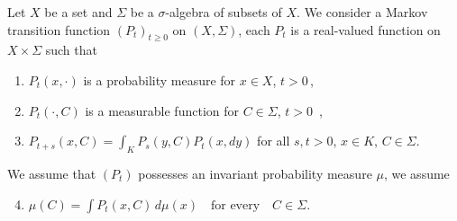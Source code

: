 \begin{example}\label{ex:c4-2.8}
%
%
%
Let $X$ be a set and $\Sigma$ be a $\sigma$-algebra of subsets of $X$.
We consider a Markov transition function $(P_{t})_{t \geq 0}$ on $(X,\Sigma)$, \ie  each $P_{t}$ is a real-valued function on $X \times \Sigma$ such that
\begin{enumerate}[\upshape (i)]
\item \label{ex:c4-2.7-1}
$P_{t}(x,\cdot)$ is a probability measure for $x \in X$, $t > 0$\,,

\item \label{ex:c4-2.7-2}
$P_{t}(\cdot,C)$ is a measurable function for $C \in \Sigma$, $t > 0$\, ,

\item \label{ex:c4-2.7-3}
$P_{t+s}(x,C) = \int_{K} P_{s}(y,C)P_{t}(x,dy)$ for all $s,t>0$, $x \in K$, $C \in \Sigma$.
\end{enumerate}
We assume that $(P_{t})$ possesses an invariant probability measure $\mu$, \ie  we assume
\begin{enumerate}[\upshape (i)]
\setcounter{enumi}{3}
\item \label{ex:c4-2.7-4}
$\mu(C) = \int P_{t}(x,C) \, d\mu(x) \quad \text{for every} \quad C \in \Sigma$.
\end{enumerate}


\end{example}
